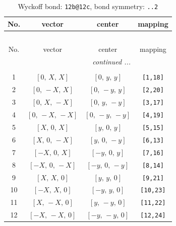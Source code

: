 \documentclass[fleqn,8pt]{jsarticle}
\begin{document}
\begin{longtable}{cccc}
\caption{Wyckoff bond: {\tt 12b@12c}, bond symmetry: {\tt ..2}}
 \\
 \hline \hline
No. & vector & center & mapping \\ \hline \endfirsthead

\multicolumn{3}{l}{\tablename\ \thetable{}} \\
 \hline \hline
No. & vector & center & mapping \\ \hline \endhead

 \hline \hline
\multicolumn{3}{r}{\footnotesize\it continued ...} \\ \endfoot

 \hline \hline
\multicolumn{3}{r}{} \\ \endlastfoot

1 & $\left[ 0,\, X,\, X \right]$ & $\left[ 0,\, y,\, y \right]$ & {\tt [1,18]} \\ \hline
2 & $\left[ 0,\, - X,\, X \right]$ & $\left[ 0,\, - y,\, y \right]$ & {\tt [2,20]} \\ \hline
3 & $\left[ 0,\, X,\, - X \right]$ & $\left[ 0,\, y,\, - y \right]$ & {\tt [3,17]} \\ \hline
4 & $\left[ 0,\, - X,\, - X \right]$ & $\left[ 0,\, - y,\, - y \right]$ & {\tt [4,19]} \\ \hline
5 & $\left[ X,\, 0,\, X \right]$ & $\left[ y,\, 0,\, y \right]$ & {\tt [5,15]} \\ \hline
6 & $\left[ X,\, 0,\, - X \right]$ & $\left[ y,\, 0,\, - y \right]$ & {\tt [6,13]} \\ \hline
7 & $\left[ - X,\, 0,\, X \right]$ & $\left[ - y,\, 0,\, y \right]$ & {\tt [7,16]} \\ \hline
8 & $\left[ - X,\, 0,\, - X \right]$ & $\left[ - y,\, 0,\, - y \right]$ & {\tt [8,14]} \\ \hline
9 & $\left[ X,\, X,\, 0 \right]$ & $\left[ y,\, y,\, 0 \right]$ & {\tt [9,21]} \\ \hline
10 & $\left[ - X,\, X,\, 0 \right]$ & $\left[ - y,\, y,\, 0 \right]$ & {\tt [10,23]} \\ \hline
11 & $\left[ X,\, - X,\, 0 \right]$ & $\left[ y,\, - y,\, 0 \right]$ & {\tt [11,22]} \\ \hline
12 & $\left[ - X,\, - X,\, 0 \right]$ & $\left[ - y,\, - y,\, 0 \right]$ & {\tt [12,24]} \\
\end{longtable}
\renewcommand{\arraystretch}{1.2}
\end{document}
